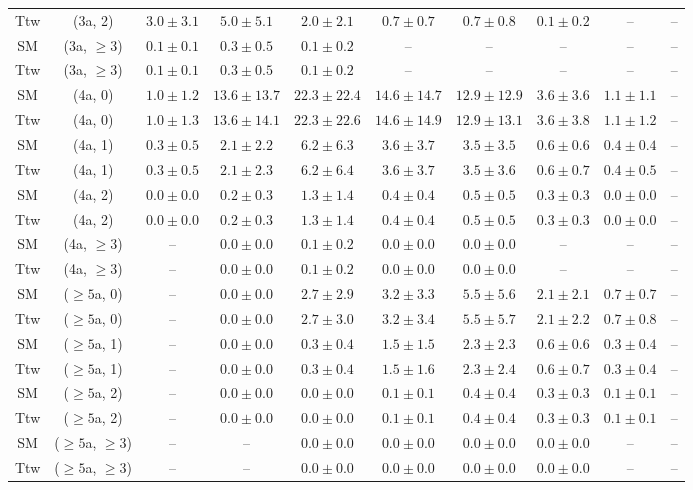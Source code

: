 \begin{table}[h!]
{\begin{tabular}{cccccccccc}
	Ttw & (3a, 2) & $3.0\pm 3.1$ & $5.0\pm 5.1$ & $2.0\pm 2.1$ & $0.7\pm 0.7$ & $0.7\pm 0.8$ & $0.1\pm 0.2$ & -- & -- \\[0.5ex] 
	SM & (3a, $\ge3$) & $0.1\pm 0.1$ & $0.3\pm 0.5$ & $0.1\pm 0.2$ & -- & -- & -- & -- & -- \\[0.5ex] 
	Ttw & (3a, $\ge3$) & $0.1\pm 0.1$ & $0.3\pm 0.5$ & $0.1\pm 0.2$ & -- & -- & -- & -- & -- \\[0.5ex] 
	SM & (4a, 0) & $1.0\pm 1.2$ & $13.6\pm 13.7$ & $22.3\pm 22.4$ & $14.6\pm 14.7$ & $12.9\pm 12.9$ & $3.6\pm 3.6$ & $1.1\pm 1.1$ & -- \\[0.5ex] 
	Ttw & (4a, 0) & $1.0\pm 1.3$ & $13.6\pm 14.1$ & $22.3\pm 22.6$ & $14.6\pm 14.9$ & $12.9\pm 13.1$ & $3.6\pm 3.8$ & $1.1\pm 1.2$ & -- \\[0.5ex] 
	SM & (4a, 1) & $0.3\pm 0.5$ & $2.1\pm 2.2$ & $6.2\pm 6.3$ & $3.6\pm 3.7$ & $3.5\pm 3.5$ & $0.6\pm 0.6$ & $0.4\pm 0.4$ & -- \\[0.5ex] 
	Ttw & (4a, 1) & $0.3\pm 0.5$ & $2.1\pm 2.3$ & $6.2\pm 6.4$ & $3.6\pm 3.7$ & $3.5\pm 3.6$ & $0.6\pm 0.7$ & $0.4\pm 0.5$ & -- \\[0.5ex] 
	SM & (4a, 2) & $0.0\pm 0.0$ & $0.2\pm 0.3$ & $1.3\pm 1.4$ & $0.4\pm 0.4$ & $0.5\pm 0.5$ & $0.3\pm 0.3$ & $0.0\pm 0.0$ & -- \\[0.5ex] 
	Ttw & (4a, 2) & $0.0\pm 0.0$ & $0.2\pm 0.3$ & $1.3\pm 1.4$ & $0.4\pm 0.4$ & $0.5\pm 0.5$ & $0.3\pm 0.3$ & $0.0\pm 0.0$ & -- \\[0.5ex] 
	SM & (4a, $\ge3$) & -- & $0.0\pm 0.0$ & $0.1\pm 0.2$ & $0.0\pm 0.0$ & $0.0\pm 0.0$ & -- & -- & -- \\[0.5ex] 
	Ttw & (4a, $\ge3$) & -- & $0.0\pm 0.0$ & $0.1\pm 0.2$ & $0.0\pm 0.0$ & $0.0\pm 0.0$ & -- & -- & -- \\[0.5ex] 
	SM & ($\ge5$a, 0) & -- & $0.0\pm 0.0$ & $2.7\pm 2.9$ & $3.2\pm 3.3$ & $5.5\pm 5.6$ & $2.1\pm 2.1$ & $0.7\pm 0.7$ & -- \\[0.5ex] 
	Ttw & ($\ge5$a, 0) & -- & $0.0\pm 0.0$ & $2.7\pm 3.0$ & $3.2\pm 3.4$ & $5.5\pm 5.7$ & $2.1\pm 2.2$ & $0.7\pm 0.8$ & -- \\[0.5ex] 
	SM & ($\ge5$a, 1) & -- & $0.0\pm 0.0$ & $0.3\pm 0.4$ & $1.5\pm 1.5$ & $2.3\pm 2.3$ & $0.6\pm 0.6$ & $0.3\pm 0.4$ & -- \\[0.5ex] 
	Ttw & ($\ge5$a, 1) & -- & $0.0\pm 0.0$ & $0.3\pm 0.4$ & $1.5\pm 1.6$ & $2.3\pm 2.4$ & $0.6\pm 0.7$ & $0.3\pm 0.4$ & -- \\[0.5ex] 
	SM & ($\ge5$a, 2) & -- & $0.0\pm 0.0$ & $0.0\pm 0.0$ & $0.1\pm 0.1$ & $0.4\pm 0.4$ & $0.3\pm 0.3$ & $0.1\pm 0.1$ & -- \\[0.5ex] 
	Ttw & ($\ge5$a, 2) & -- & $0.0\pm 0.0$ & $0.0\pm 0.0$ & $0.1\pm 0.1$ & $0.4\pm 0.4$ & $0.3\pm 0.3$ & $0.1\pm 0.1$ & -- \\[0.5ex] 
	SM & ($\ge5$a, $\ge3$) & -- & -- & $0.0\pm 0.0$ & $0.0\pm 0.0$ & $0.0\pm 0.0$ & $0.0\pm 0.0$ & -- & -- \\[0.5ex] 
	Ttw & ($\ge5$a, $\ge3$) & -- & -- & $0.0\pm 0.0$ & $0.0\pm 0.0$ & $0.0\pm 0.0$ & $0.0\pm 0.0$ & -- & -- \\[0.5ex] 
	\hline
	\hline
\end{tabular}}
\end{table}
